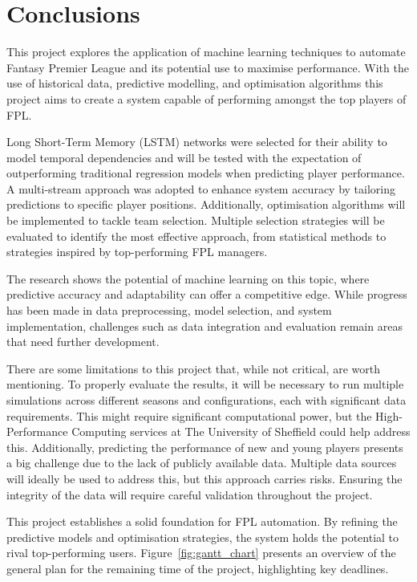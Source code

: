 \chapter{Conclusions}

This project explores the application of machine learning techniques to automate Fantasy Premier League and its potential use to maximise performance. With the use of historical data, predictive modelling, and optimisation algorithms this project aims to create a system capable of performing amongst the top players of FPL.

Long Short-Term Memory (LSTM) networks were selected for their ability to model temporal dependencies and will be tested with the expectation of outperforming traditional regression models when predicting player performance. A multi-stream approach was adopted to enhance system accuracy by tailoring predictions to specific player positions. Additionally, optimisation algorithms will be implemented to tackle team selection. Multiple selection strategies will be evaluated to identify the most effective approach, from statistical methods to strategies inspired by top-performing FPL managers.

The research shows the potential of machine learning on this topic, where predictive accuracy and adaptability can offer a competitive edge. While progress has been made in data preprocessing, model selection, and system implementation, challenges such as data integration and evaluation remain areas that need further development.

There are some limitations to this project that, while not critical, are worth mentioning. To properly evaluate the results, it will be necessary to run multiple simulations across different seasons and configurations, each with significant data requirements. This might require significant computational power, but the High-Performance Computing services at The University of Sheffield could help address this. Additionally, predicting the performance of new and young players presents a big challenge due to the lack of publicly available data. Multiple data sources will ideally be used to address this, but this approach carries risks. Ensuring the integrity of the data will require careful validation throughout the project.

This project establishes a solid foundation for FPL automation. By refining the predictive models and optimisation strategies, the system holds the potential to rival top-performing users. Figure~\ref{fig:gantt_chart} presents an overview of the general plan for the remaining time of the project, highlighting key deadlines.

